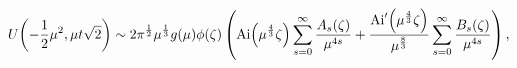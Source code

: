 \[\mathop{U\/}\nolimits\!\left(-\frac{1}{2}\mu^{2},\mu t\sqrt{2}\right)\sim 2\pi%
^{\frac{1}{2}}\mu^{\frac{1}{3}}g(\mu)\phi(\zeta)\*\left(\mathop{\mathrm{Ai}\/}%
\nolimits\!\left(\mu^{\frac{4}{3}}\zeta\right)\sum_{s=0}^{\infty}\frac{A_{s}(%
\zeta)}{\mu^{4s}}+\frac{\mathop{\mathrm{Ai}\/}\nolimits'\!\left(\mu^{\frac{4}{%
3}}\zeta\right)}{\mu^{\frac{8}{3}}}\sum_{s=0}^{\infty}\frac{B_{s}(\zeta)}{\mu^%
{4s}}\right),\]